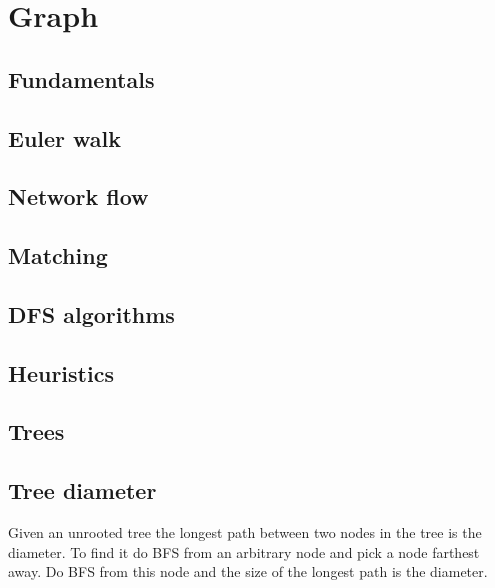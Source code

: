 \chapter{Graph}

\section{Fundamentals}

\section{Euler walk}

\section{Network flow}

\section{Matching}

\section{DFS algorithms}

\section{Heuristics}

\section{Trees}
\section{Tree diameter}
	Given an unrooted tree the longest path between two nodes in the tree is the diameter. To find it do BFS from an arbitrary node and pick a node farthest away. Do BFS from this node and the size of the longest path is the diameter.
